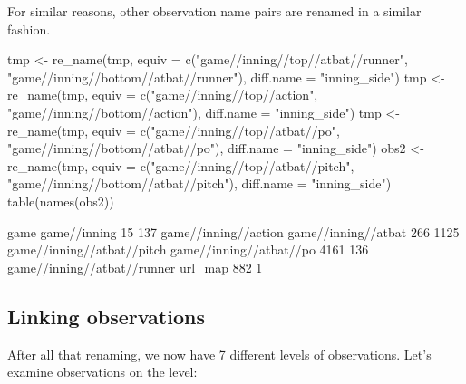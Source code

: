 \begin{article}
\begin{Schunk}
\end{Schunk}
%
For similar reasons, other observation name pairs are renamed in a
similar fashion.
%
\begin{Schunk}
\begin{Sinput}
tmp <- re_name(tmp, equiv = c("game//inning//top//atbat//runner",                             
  "game//inning//bottom//atbat//runner"), diff.name = "inning_side")
tmp <- re_name(tmp, equiv = c("game//inning//top//action",                             
  "game//inning//bottom//action"), diff.name = "inning_side")  
tmp <- re_name(tmp, equiv = c("game//inning//top//atbat//po",                            
  "game//inning//bottom//atbat//po"), diff.name = "inning_side")
obs2 <- re_name(tmp, equiv = c("game//inning//top//atbat//pitch",                             
  "game//inning//bottom//atbat//pitch"), diff.name = "inning_side") 
table(names(obs2))
\end{Sinput}
\begin{Soutput}

                       game                game//inning 
                         15                         137 
       game//inning//action         game//inning//atbat 
                        266                        1125 
 game//inning//atbat//pitch     game//inning//atbat//po 
                       4161                         136 
game//inning//atbat//runner                     url_map 
                        882                           1 
\end{Soutput}
\end{Schunk}

\subsection{Linking observations}

After all that renaming, we now have 7
different levels of observations. Let's examine observations on the
 level:
%
\begin{Schunk}
\end{Schunk}
\end{article}
